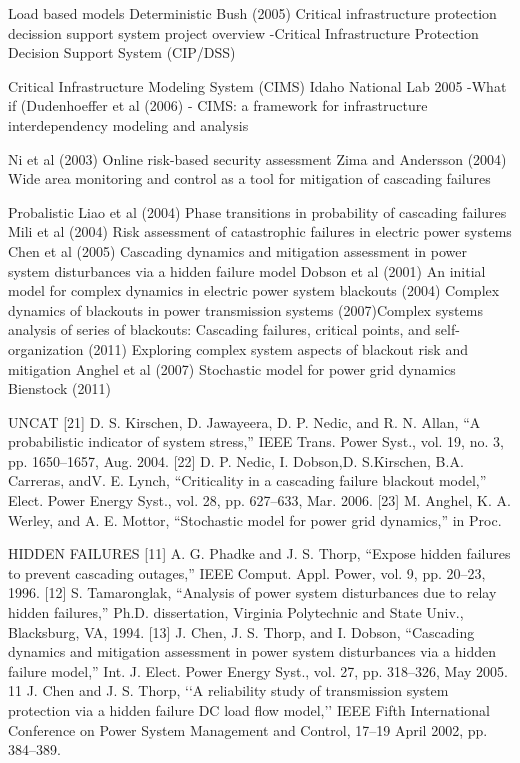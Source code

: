 Load based models
Deterministic
Bush (2005) Critical infrastructure protection decission support system project overview
-Critical Infrastructure Protection Decision Support System (CIP/DSS)

Critical Infrastructure Modeling System (CIMS) Idaho National Lab 2005
-What if (Dudenhoeffer et al (2006) - CIMS: a framework for infrastructure interdependency modeling and analysis

Ni et al (2003) Online risk-based security assessment
Zima and Andersson (2004) Wide area monitoring and control as a tool for mitigation of cascading failures


Probalistic
Liao et al (2004) Phase transitions in probability of cascading failures
Mili et al (2004) Risk assessment of catastrophic failures in electric power systems
Chen et al (2005) Cascading dynamics and mitigation assessment in power system disturbances via a hidden failure model
Dobson et al 
(2001)  An initial model for complex dynamics in electric power system blackouts
(2004) Complex dynamics of blackouts in power transmission systems
(2007)Complex systems analysis of series of blackouts: Cascading failures, critical points, and self-organization
 (2011) Exploring complex system aspects of blackout risk and mitigation
Anghel et al (2007) Stochastic model for power grid dynamics
Bienstock (2011)

UNCAT
[21] D. S. Kirschen, D. Jawayeera, D. P. Nedic, and R. N. Allan, “A probabilistic
indicator of system stress,” IEEE Trans. Power Syst., vol. 19,
no. 3, pp. 1650–1657, Aug. 2004.
[22] D. P. Nedic, I. Dobson,D. S.Kirschen, B.A. Carreras, andV. E. Lynch,
“Criticality in a cascading failure blackout model,” Elect. Power Energy
Syst., vol. 28, pp. 627–633, Mar. 2006.
[23] M. Anghel, K. A. Werley, and A. E. Mottor, “Stochastic model for
power grid dynamics,” in Proc.


HIDDEN FAILURES
[11] A. G. Phadke and J. S. Thorp, “Expose hidden failures to prevent cascading
outages,” IEEE Comput. Appl. Power, vol. 9, pp. 20–23, 1996.
[12] S. Tamaronglak, “Analysis of power system disturbances due to relay
hidden failures,” Ph.D. dissertation, Virginia Polytechnic and State
Univ., Blacksburg, VA, 1994.
[13] J. Chen, J. S. Thorp, and I. Dobson, “Cascading dynamics and mitigation
assessment in power system disturbances via a hidden failure
model,” Int. J. Elect. Power Energy Syst., vol. 27, pp. 318–326, May
2005.
11 J. Chen and J. S. Thorp, ‘‘A reliability study of transmission system protection
via a hidden failure DC load flow model,’’ IEEE Fifth International
Conference on Power System Management and Control, 17–19 April
2002, pp. 384–389.


